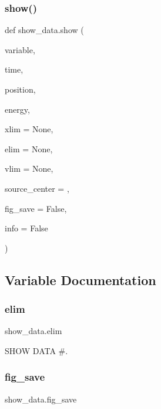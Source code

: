 \mbox{\label{namespaceshow__data_a721e32af0ead3a2589ece3597f8af588}} 
\subsubsection{\texorpdfstring{show()}{show()}}
{\footnotesize\ttfamily def show\+\_\+data.\+show (\begin{DoxyParamCaption}\item[{}]{variable,  }\item[{}]{time,  }\item[{}]{position,  }\item[{}]{energy,  }\item[{}]{xlim = {\ttfamily None},  }\item[{}]{elim = {\ttfamily None},  }\item[{}]{vlim = {\ttfamily None},  }\item[{}]{source\+\_\+center = {},  }\item[{}]{fig\+\_\+save = {\ttfamily False},  }\item[{}]{info = {\ttfamily False} }\end{DoxyParamCaption})}



\subsection{Variable Documentation}
\mbox{\label{namespaceshow__data_a4a13158954bd6cb505cff7ce9a044bad}} 
\subsubsection{\texorpdfstring{elim}{elim}}
{\footnotesize\ttfamily show\+\_\+data.\+elim}



S\+H\+OW D\+A\+TA \#. 

\mbox{\label{namespaceshow__data_a87ba16bdf51b27121c97f78ccf6f2d74}} 
\subsubsection{\texorpdfstring{fig\+\_\+save}{fig\_save}}
{\footnotesize\ttfamily show\+\_\+data.\+fig\+\_\+save}

